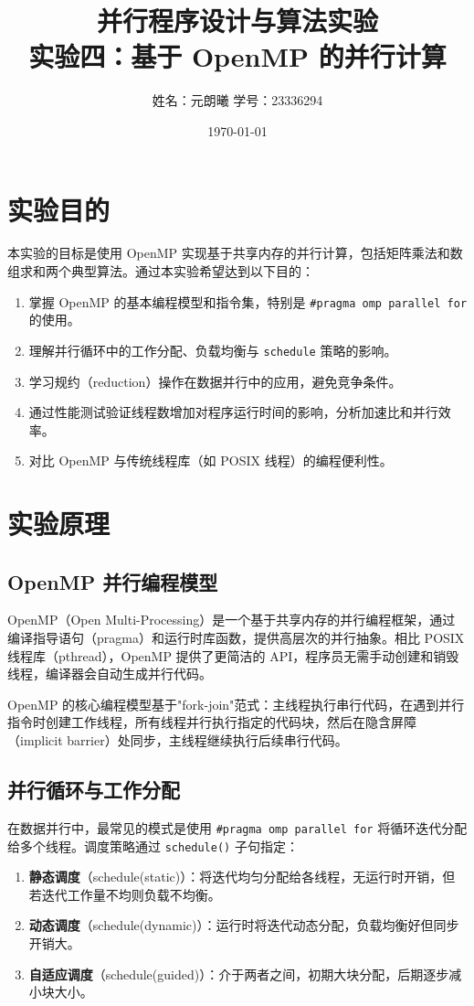 \documentclass[12pt,a4paper]{ctexart}
\title{并行程序设计与算法实验\\实验四：基于 OpenMP 的并行计算}
\author{姓名：元朗曦 \quad 学号：23336294}
\date{\today}
\begin{document}
\maketitle

\section{实验目的}
本实验的目标是使用 OpenMP 实现基于共享内存的并行计算，包括矩阵乘法和数组求和两个典型算法。通过本实验希望达到以下目的：
\begin{enumerate}[itemsep=0.3em]
  \item 掌握 OpenMP 的基本编程模型和指令集，特别是 \texttt{\#pragma omp parallel for} 的使用。
  \item 理解并行循环中的工作分配、负载均衡与 \texttt{schedule} 策略的影响。
  \item 学习规约（reduction）操作在数据并行中的应用，避免竞争条件。
  \item 通过性能测试验证线程数增加对程序运行时间的影响，分析加速比和并行效率。
  \item 对比 OpenMP 与传统线程库（如 POSIX 线程）的编程便利性。
\end{enumerate}

\section{实验原理}

\subsection{OpenMP 并行编程模型}
OpenMP（Open Multi-Processing）是一个基于共享内存的并行编程框架，通过编译指导语句（pragma）和运行时库函数，提供高层次的并行抽象。相比 POSIX 线程库（pthread），OpenMP 提供了更简洁的 API，程序员无需手动创建和销毁线程，编译器会自动生成并行代码。

OpenMP 的核心编程模型基于"fork-join"范式：主线程执行串行代码，在遇到并行指令时创建工作线程，所有线程并行执行指定的代码块，然后在隐含屏障（implicit barrier）处同步，主线程继续执行后续串行代码。

\subsection{并行循环与工作分配}
在数据并行中，最常见的模式是使用 \texttt{\#pragma omp parallel for} 将循环迭代分配给多个线程。调度策略通过 \texttt{schedule()} 子句指定：

\begin{enumerate}[itemsep=0.2em]
  \item \textbf{静态调度}（schedule(static)）：将迭代均匀分配给各线程，无运行时开销，但若迭代工作量不均则负载不均衡。
  \item \textbf{动态调度}（schedule(dynamic)）：运行时将迭代动态分配，负载均衡好但同步开销大。
  \item \textbf{自适应调度}（schedule(guided)）：介于两者之间，初期大块分配，后期逐步减小块大小。
\end{enumerate}
\end{document}
